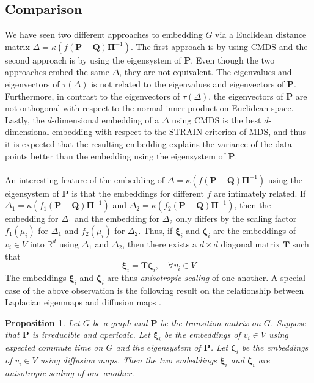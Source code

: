 \documentclass[10pt,twocolumn]{article}
\newtheorem{proposition}[theorem]{Proposition}
\numberwithin{equation}{section}
\begin{document}
\subsection{Comparison}
\label{sec:comparing-embeddings}
\noindent
We have seen two different approaches to embedding $G$ via a Euclidean
distance matrix $\Delta = \kappa(f(\mathbf{P} -
\mathbf{Q})\bm{\Pi}^{-1})$. The first approach is by using 
CMDS and the second approach is by using the eigensystem of
$\mathbf{P}$.  Even though the two approaches embed the same $\Delta$,
they are not equivalent. The eigenvalues and eigenvectors of
$\tau(\Delta)$ is not related to the eigenvalues and eigenvectors of
$\mathbf{P}$. Furthermore, in contrast to the eigenvectors of
$\tau(\Delta)$, the eigenvectors of $\mathbf{P}$ are not orthogonal
with respect to the normal inner product on Euclidean space. Lastly,
the $d$-dimensional embedding of a $\Delta$ using CMDS is the
best $d$-dimensional embedding with respect to the STRAIN criterion of
MDS, and thus it is expected that the resulting embedding explains the
variance of the data points better than the embedding using the
eigensystem of $\mathbf{P}$. \\ \\
\noindent
An interesting feature of the embedding of $\Delta =
\kappa(f(\mathbf{P} - \mathbf{Q})\bm{\Pi}^{-1}) $ using the
eigensystem of $\mathbf{P}$ is that the embeddings for different $f$
are intimately related. If $\Delta_1 = \kappa(f_1(\mathbf{P} -
\mathbf{Q})\bm{\Pi}^{-1})$ and $\Delta_2 = \kappa(f_2(\mathbf{P} -
\mathbf{Q})\bm{\Pi}^{-1})$, then the embedding for $\Delta_1$ and the
embedding for $\Delta_2$ only differs by the scaling factor
$f_1(\mu_i)$ for $\Delta_1$ and $f_2(\mu_i)$ for $\Delta_2$. Thus, if
$\bm{\xi}_i$ and $\bm{\zeta}_i$ are the embeddings of $v_i \in V$ into
$\mathbb{R}^{d}$ using $\Delta_1$ and $\Delta_2$, then there exists a
$d \times d$ diagonal matrix $\mathbf{T}$ such that
\begin{equation}
  \label{eq:23}
  \bm{\xi}_i = \mathbf{T} \bm{\zeta}_i, \quad \forall v_i \in V
\end{equation}
The embeddings $\bm{\xi}_i$ and $\bm{\zeta}_i$ are thus {\em
  anisotropic scaling} of one another. A special case of the above
observation is the following result on the relationship between
Laplacian eigenmaps \cite{belkin03:_laplac} and diffusion maps
\cite{coifman06:_diffus_maps}.
\begin{proposition}
  \label{prop:9}
  Let $G$ be a graph and $\mathbf{P}$ be the transition matrix on
  $G$. Suppose that $\mathbf{P}$ is irreducible and aperiodic. Let
  $\bm{\xi}_i$ be the embeddings of $v_i \in V$ using expected commute
  time on $G$ and the eigensystem of $\mathbf{P}$. Let $\bm{\zeta}_i$
  be the embeddings of $v_i \in V$ using diffusion maps. Then the two
  embeddings $\bm{\xi}_i$ and $\bm{\zeta}_i$ are anisotropic scaling
  of one another.
\end{proposition}
\end{document}
